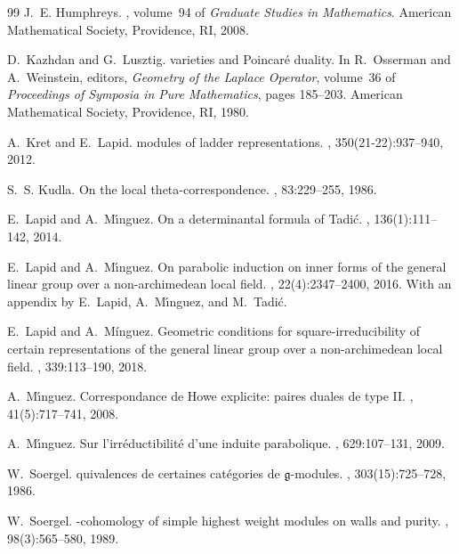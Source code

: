 \documentclass[10pt,a4paper]{article}
\theoremstyle{definition}
\theoremstyle{remark}
\numberwithin{equation}{section}
\begin{document}
\begin{thebibliography}{99}
J.~E. Humphreys.
, volume~94 of {\em Graduate Studies in Mathematics}.
\newblock American Mathematical Society, Providence, RI, 2008.

D.~Kazhdan and G.~Lusztig.
 varieties and {Poincar\'e} duality.
\newblock In R.~Osserman and A.~Weinstein, editors,
  {\em Geometry of the Laplace Operator}, volume~36 of
  {\em Proceedings of Symposia in Pure Mathematics}, pages 185--203.
  American Mathematical Society, Providence, RI, 1980.

A.~Kret and E.~Lapid.
 modules of ladder representations.
, 350(21-22):937--940, 2012.

S.~S. Kudla.
\newblock On the local theta-correspondence.
, 83:229--255, 1986.

E.~Lapid and A.~M{\'{\i}}nguez.
\newblock On a determinantal formula of {Tadi{\'c}}.
, 136(1):111--142, 2014.

E.~Lapid and A.~M{\'{\i}}nguez.
\newblock On parabolic induction on inner forms of the general linear group
  over a non-archimedean local field.
, 22(4):2347--2400, 2016.
\newblock With an appendix by E.~Lapid, A.~M{\'{\i}}nguez, and M.~Tadi{\'c}.

E.~Lapid and A.~M{\'{i}}nguez.
\newblock Geometric conditions for square-irreducibility of certain
  representations of the general linear group over a non-archimedean local
  field.
, 339:113--190, 2018.

A.~M{\'{\i}}nguez.
\newblock Correspondance de {Howe} explicite: paires duales de type {II}.
, 41(5):717--741, 2008.

A.~M{\'{\i}}nguez.
\newblock Sur l'irr{\'e}ductibilit{\'e} d'une induite parabolique.
, 629:107--131, 2009.

W.~Soergel.
quivalences de certaines cat\'egories de {$\mathfrak g$}-modules.
, 303(15):725--728, 1986.

W.~Soergel.
-cohomology of simple highest weight modules on
  walls and purity.
, 98(3):565--580, 1989.


\end{thebibliography}
\end{document}
